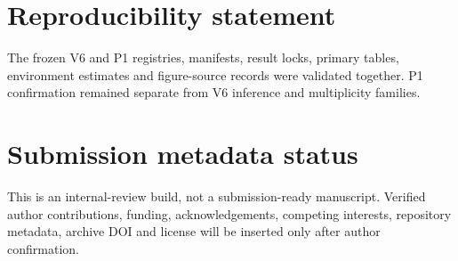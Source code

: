 \documentclass[10pt]{article}
\begin{document}
\section*{Reproducibility statement}
The frozen V6 and P1 registries, manifests, result locks, primary tables, environment estimates and figure-source records were validated together. P1 confirmation remained separate from V6 inference and multiplicity families.

\section*{Submission metadata status}
This is an internal-review build, not a submission-ready manuscript. Verified author contributions, funding, acknowledgements, competing interests, repository metadata, archive DOI and license will be inserted only after author confirmation.
\small


\end{document}
